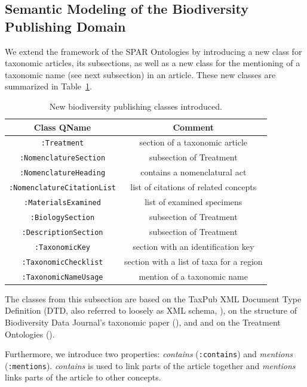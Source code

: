 \subsection{Semantic Modeling of the Biodiversity Publishing Domain}

We extend the framework of the SPAR Ontologies by introducing a new class for taxonomic articles, its subsections, as well as a new class for the mentioning of a taxonomic name (see next subsection) in an article. These new classes are summarized in Table~\ref{bibliographic_classes}.

\begin{table}[h!]
\caption{New biodiversity publishing classes introduced.}
      \begin{tabular}{cc}
        \hline
          Class QName             & Comment\\  \hline
  {\tt :Treatment}                & section of a taxonomic article\\
  {\tt :NomenclatureSection}      & subsection of Treatment\\
  {\tt :NomenclatureHeading}      & contains a nomenclatural act \\
  {\tt :NomenclatureCitationList} & list of citations of related concepts\\
  {\tt :MaterialsExamined}        & list of examined specimens\\
  {\tt :BiologySection}           & subsection of Treatment\\
  {\tt :DescriptionSection}       & subsection of Treatment\\
  {\tt :TaxonomicKey}             & section with an identification key\\
  {\tt :TaxonomicChecklist}       & section with a list of taxa for a region\\ 
  {\tt :TaxonomicNameUsage}       & mention of a taxonomic name\\ \hline

      \end{tabular}
      \label{bibliographic_classes}
\end{table}

The classes from this subsection are based on the TaxPub XML Document Type Definition (DTD, also referred to loosely as XML schema, \cite{catapano_taxpub:_2010}), on the structure of Biodiversity Data Journal's
taxonomic paper (\cite{smith_beyond_2013}), and and on the Treatment Ontologies (\cite{catapano_treatment_2016}).

Furthermore, we introduce two properties: \emph{contains} ({\tt :contains}) and \emph{mentions} ({\tt :mentions}). \emph{contains} is used to link parts of the article together and \emph{mentions} links parts of the article to other concepts.

